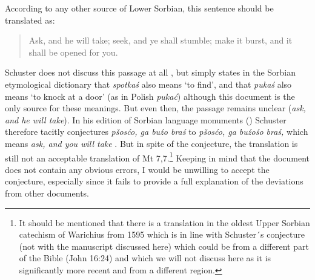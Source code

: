 \documentclass[output=paper,hidelinks]{langscibook}
\begin{document}
 
According to any other source of Lower Sorbian, this sentence should be translated as:
 

\begin{quote}
Ask, and he will take; seek, and ye shall stumble; make it burst, and it shall be opened for you.
\end{quote}

\largerpage
 
Schuster does not discuss this passage at all \citep[293]{Schuster1967}, but simply states in the Sorbian etymological dictionary \citep{Schuster1989} that \textit{spotkaś} also means ‘to find’, and that \textit{pukaś} also means ‘to knock at a door’ (as in Polish \textit{pukać}) although this document is the only source for these meanings. But even then, the passage remains unclear (\textit{ask, and he will take}). In his edition of Sorbian language monuments (\citeyear{Schuster1967}) Schuster therefore tacitly conjectures \textit{pšosćo, ga buźo braś} to \textit{pšosćo, ga buźośo braś,} which means \textit{ask, and you will take} \citep[293]{Schuster1967}. But in spite of the conjecture, the translation is still not an acceptable translation of Mt 7,7.\footnote{It should be mentioned that there is a translation in the oldest Upper Sorbian catechism of Warichius from 1595 \citep[126]{Schuster2001} which is in line with Schuster´s conjecture (not with the manuscript discussed here) which could be from a different part of the Bible (John 16:24) and which we will not discuss here as it is significantly more recent and from a different region.} Keeping in mind that the document does not contain any obvious errors, I would be unwilling to accept the conjecture, especially since it fails to provide a full explanation of the deviations from other documents.
 
\end{document}
